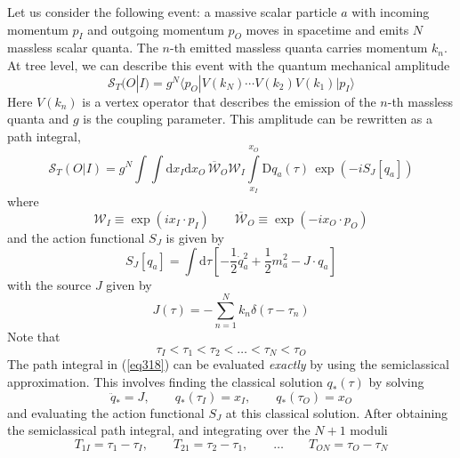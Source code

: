 Let us consider the following event: a massive scalar particle $a$ with incoming momentum $p_{I}$ and outgoing momentum $p_{O}$ moves in spacetime and emits $N$ massless scalar quanta. The $n$-th emitted massless quanta carries momentum $k_{n}$. At tree level, we can describe this event with the quantum mechanical amplitude
\begin{equation}
	\mathcal{S}_{T}(O|I) = g^{N} \langle p_{O} | V(k_{N}) \cdots V(k_{2}) V(k_{1}) | p_{I} \rangle
\end{equation}
Here $V(k_{n})$ is a vertex operator that describes the emission of the $n$-th massless quanta and $g$ is the coupling parameter. This amplitude can be rewritten as a path integral,
\begin{equation}
	\mathcal{S}_{T}(O|I) = g^{N} \int \int \mathrm{d}x_{I} \mathrm{d}x_{O} \, \overline{\mathcal{W}}_{O} \mathcal{W}_{I} \int\limits_{x_{I}}^{x_{O}} \mathrm{D}q_{a}(\tau) \, \exp{\left( -i S_{J}[q_{a}] \right)} \label{eq318}
\end{equation}
where
\begin{equation}
	\mathcal{W}_{I} \equiv \exp{(i x_{I} \cdot p_{I})} \qquad \overline{\mathcal{W}}_{O} \equiv \exp{(-i x_{O} \cdot p_{O})}
\end{equation}
and the action functional $S_{J}$ is given by
\begin{equation}
	S_{J}[q_{a}] = \int \mathrm{d}\tau \left[ -\frac{1}{2}\dot{q}_{a}^{2} + \frac{1}{2}m_{a}^{2} - J \cdot q_{a} \right]
\end{equation}
with the source $J$ given by
\begin{equation}
	J(\tau) = -\sum_{n = 1}^{N} k_{n} \delta(\tau - \tau_{n})
\end{equation}
Note that
\begin{equation}
	\tau_{I} < \tau_{1} < \tau_{2} < \ldots < \tau_{N} < \tau_{O}
\end{equation}
The path integral in (\ref{eq318}) can be evaluated \textit{exactly} by using the semiclassical approximation. This involves finding the classical solution $q_{*}(\tau)$ by solving
\begin{equation}
	\ddot{q}_{*} = J, \qquad q_{*}(\tau_{I}) = x_{I}, \qquad q_{*}(\tau_{O}) = x_{O}
\end{equation}
and evaluating the action functional $S_{J}$ at this classical solution. After obtaining the semiclassical path integral, and integrating over the $N + 1$ moduli
\begin{equation}
	T_{1I} = \tau_{1} - \tau_{I}, \qquad T_{21} = \tau_{2} - \tau_{1}, \qquad \ldots \qquad T_{ON} = \tau_{O} - \tau_{N}
\end{equation}
